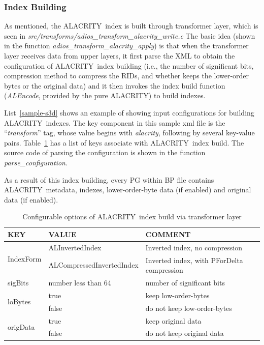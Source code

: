 \documentclass[11pt,a4paper]{article}
\newcommand{\alac}{ALACRITY}
\begin{document}
\subsubsection{Index Building}
\label{sec:transform-index-build}

As mentioned, the \alac\ index is built through transformer layer, which is seen in \emph{src\//transforms\//adios\_transform\_alacrity\_write.c}
The basic idea (shown in the function \emph{adios\_transform\_alacrity\_apply}) is that when the transformer layer receives data from upper layers, it first parse the XML to obtain the configuration of \alac\ index building (i.e., the number of significant bits, compression method to compress the RIDs, and whether keeps the lower-order bytes or the original data) and it then invokes the index build function (\emph{ALEncode}, provided by the pure \alac) to build indexes. 

List~\ref{sample-s3d} shows an example of showing input configurations for building \alac\ indexes. The key component in this sample xml file is the ``\emph{transform}'' tag, whose value begins with \emph{alacrity}, following by several key-value pairs. Table~\ref{table:index-build-conf} has a list of keys associate with \alac\ index build.  
The source code of parsing the configuration is shown in the function \emph{parse\_configuration}.

As a result of this index building, every PG within BP file contains \alac\ metadata, indexes, lower-order-byte data (if enabled) and original data (if enabled).

\begin{table}
\begin{tabular}{ |l|l|l| }
\hline

KEY & VALUE & COMMENT \\ \hline
\multirow{2}{*}{IndexForm} & ALInvertedIndex & Inverted index, no compression\\
 & ALCompressedInvertedIndex & Inverted index, with PForDelta compression \\ \hline
\multirow{1}{*}{sigBits} & number less than 64 & number of significant bits\\ \hline
\multirow{2}{*}{loBytes} & true & keep low-order-bytes\\
 & false & do not keep low-order-bytes \\
\hline
\multirow{2}{*}{origData} & true & keep original data \\
 & false & do not keep original data  \\
\hline
\end{tabular}
\caption{Configurable options of \alac\ index build via transformer layer}
\label{table:index-build-conf}
\end{table}
\end{document}
